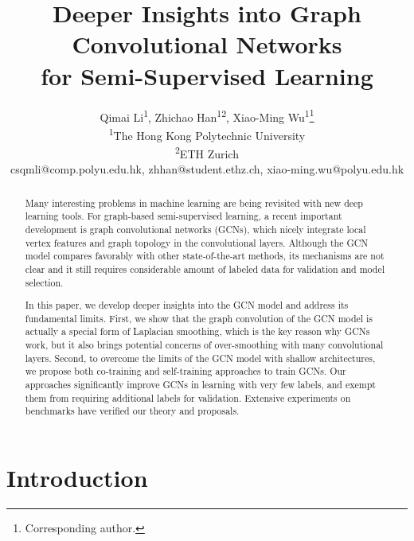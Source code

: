 \documentclass[letterpaper]{article} \usepackage{aaai18}  \usepackage{times}  \usepackage{helvet}  \usepackage{courier}  \usepackage{url}  \usepackage{graphicx}  \usepackage{algorithm}
\begin{document}
\title{Deeper Insights into Graph Convolutional Networks \\for Semi-Supervised Learning}


\author{ Qimai Li\textsuperscript{1}, Zhichao Han\textsuperscript{12}, Xiao-Ming Wu\textsuperscript{1}\thanks{Corresponding author.}\\
    \textsuperscript{1}{The Hong Kong Polytechnic University}\\
    \textsuperscript{2}{ETH Zurich}\\
    csqmli@comp.polyu.edu.hk,
    zhhan@student.ethz.ch,
    xiao-ming.wu@polyu.edu.hk
}

\maketitle
\begin{abstract}


Many interesting problems in machine learning are being revisited with new deep learning tools. For graph-based semi-supervised learning, a recent important development is graph convolutional networks (GCNs), which nicely integrate local vertex features and graph topology in the convolutional layers. Although the GCN model compares favorably with other state-of-the-art methods, its mechanisms are not clear and it still requires considerable amount of labeled data for validation and model selection.

\indent In this paper, we develop deeper insights into the GCN model and address its fundamental limits. First, we show that the graph convolution of the GCN model is actually a special form of Laplacian smoothing, which is the key reason why GCNs work, but it also brings potential concerns of over-smoothing with many convolutional layers. Second, to overcome the limits of the GCN model with shallow architectures, we propose both co-training and self-training approaches to train GCNs. Our approaches significantly improve GCNs in learning with very few labels, and exempt them from requiring additional labels for validation. Extensive experiments on benchmarks have verified our theory and proposals.












\end{abstract}
\section{Introduction}\label{sec:introduction}
\end{document}
